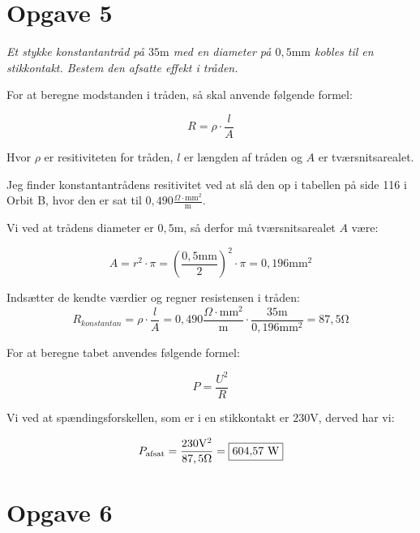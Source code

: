 \documentclass[a4paper, 12pt]{article}
\begin{document}
\section*{Opgave 5}
\textit{Et stykke konstantantråd på \(35 \si{\metre}\) med en diameter på \(0,5 \textrm{mm}\) kobles til en stikkontakt. Bestem den afsatte effekt i tråden.} \newline

For at beregne modstanden i tråden, så skal anvende følgende formel:

\begin{equation*}
	R=\rho \cdot \frac{l}{A}
\end{equation*}

Hvor \(\rho\) er resitiviteten for tråden, \(l\) er længden af tråden og \(A\) er tværsnitsarealet.

Jeg finder konstantantrådens resitivitet ved at slå den op i tabellen på side 116 i Orbit B, hvor den er sat til \(0,490 \frac{\Omega \cdot\textrm{mm}^{2}}{\si{\metre}}\). \newline

Vi ved at trådens diameter er \(0,5 \si{\metre}\), så derfor må tværsnitsarealet \(A\) være:

\begin{equation*}
	A=r^{2} \cdot \pi = \left( \frac{0,5 \textrm{mm}}{2} \right)^{2} \cdot \pi = 0,196 \textrm{mm}^{2}
\end{equation*}

Indsætter de kendte værdier og regner resistensen i tråden:
\begin{equation*}
	R_{konstantan} =\rho \cdot \frac{l}{A} = 0,490 \frac{\Omega \cdot\textrm{mm}^{2}}{\si{\metre}} \cdot \frac{35 \si{\metre}}{0,196 \textrm{mm}^{2}} = 87,5 \si{\ohm}
\end{equation*}

For at beregne tabet anvendes følgende formel:

\begin{equation*}
	P= \frac{U^{2}}{R}
\end{equation*}

Vi ved at spændingsforskellen, som er i en stikkontakt er \(230 \si{\volt}\), derved har vi:

\begin{equation*}
	P_{\textrm{afsat}} = \frac{230 \si{\volt}^{2}}{87,5 \si{\ohm}} = \framebox{604,57 \si{\watt}}
\end{equation*}

\section*{Opgave 6} 
\end{document}

